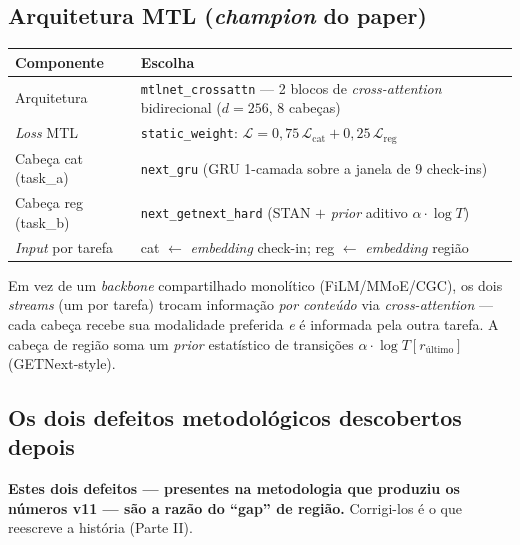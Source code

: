 \documentclass[11pt,a4paper]{article}
\begin{document}
\subsection{Arquitetura MTL (\textit{champion} do paper)}

\begin{table}[H]
\centering
\small
\begin{tabular}{ll}
\toprule
\textbf{Componente} & \textbf{Escolha} \\
\midrule
Arquitetura & \texttt{mtlnet\_crossattn} --- 2 blocos de \textit{cross-attention} bidirecional ($d=256$, 8 cabeças) \\
\textit{Loss} MTL & \texttt{static\_weight}: $\mathcal{L}=0{,}75\,\mathcal{L}_\text{cat}+0{,}25\,\mathcal{L}_\text{reg}$ \\
Cabeça cat (task\_a) & \texttt{next\_gru} (GRU 1-camada sobre a janela de 9 check-ins) \\
Cabeça reg (task\_b) & \texttt{next\_getnext\_hard} (STAN $+$ \textit{prior} aditivo $\alpha\cdot\log T$) \\
\textit{Input} por tarefa & cat $\leftarrow$ \textit{embedding} check-in; reg $\leftarrow$ \textit{embedding} região \\
\bottomrule
\end{tabular}
\end{table}

\noindent Em vez de um \textit{backbone} compartilhado monolítico (FiLM/MMoE/CGC), os dois
\textit{streams} (um por tarefa) trocam informação \emph{por conteúdo} via \textit{cross-attention} ---
cada cabeça recebe sua modalidade preferida \emph{e} é informada pela outra tarefa. A cabeça de região
soma um \textit{prior} estatístico de transições $\alpha\cdot\log T[r_\text{último}]$ (GETNext-style).

\subsection{\textcolor{red!60!black}{Os dois defeitos metodológicos descobertos depois}}\label{sec:bugs}

\textbf{Estes dois defeitos --- presentes na metodologia que produziu os números v11 --- são a razão
do ``gap'' de região.} Corrigi-los é o que reescreve a história (Parte II).
\end{document}
